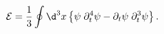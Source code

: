 \begin{equation}
{\mathcal E} =
{1\over3} \oint \d^3 x \left\{ 
\psi \; \partial_t^4 \psi - \partial_t\psi \; \partial_t^3 \psi
\right\}.
\end{equation}


